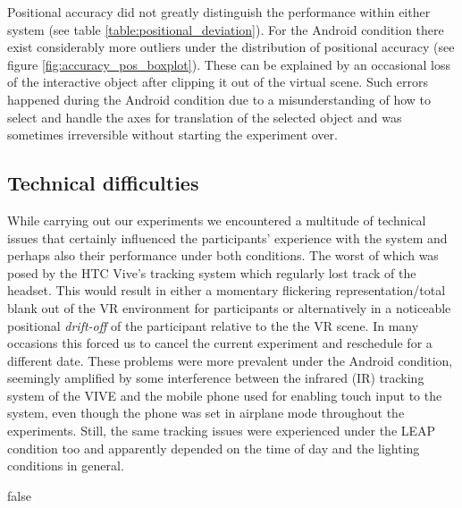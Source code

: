 Positional accuracy did not greatly distinguish the performance within either system (see table \ref{table:positional_deviation}).
For the Android condition there exist considerably more outliers under the distribution of positional accuracy (see figure \ref{fig:accuracy_pos_boxplot}).
These can be explained by an occasional loss of the interactive object after clipping it out of the virtual scene.
Such errors happened during the Android condition due to a misunderstanding of how to select and handle the axes for translation of the selected object and was sometimes irreversible without starting the experiment over.

\subsection{Technical difficulties}
While carrying out our experiments we encountered a multitude of technical issues that certainly influenced the participants' experience with the system and perhaps also their performance under both conditions.
The worst of which was posed by the HTC Vive's tracking system which regularly lost track of the headset.
This would result in either a momentary flickering representation/total blank out of the VR environment for participants or alternatively in a noticeable positional \textit{drift-off} of the participant relative to the the VR scene.
In many occasions this forced us to cancel the current experiment and reschedule for a different date.
These problems were more prevalent under the Android condition, seemingly amplified by some interference between the infrared (IR) tracking system of the VIVE and the mobile phone used for enabling touch input to the system, even though the phone was set in airplane mode throughout the experiments.
Still, the same tracking issues were experienced under the LEAP condition too and apparently depended on the time of day and the lighting conditions in general.


\if false
